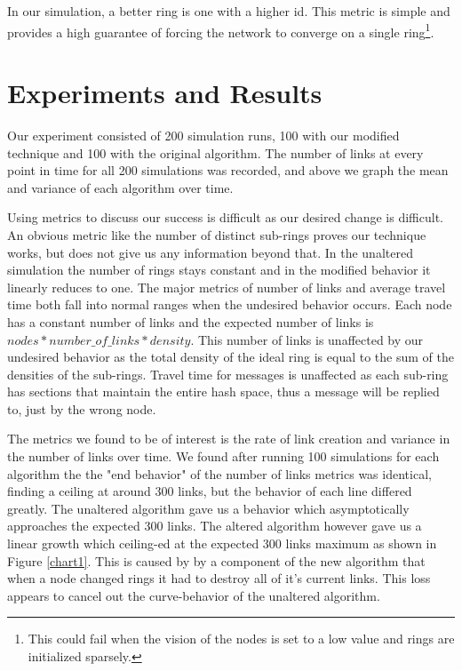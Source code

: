 \documentclass[12pt]{ieeetran} %
\begin{document}
In our simulation, a better ring is one with a higher id.   This metric is simple and  provides a high guarantee of forcing the network to converge on a single ring\footnote{This could fail when the vision of the nodes is set to a low value and rings are initialized sparsely.}.










\section{Experiments and Results}
Our experiment consisted of 200 simulation runs, 100 with our modified technique and 100 with the original algorithm. The number of links at every point in time for all 200 simulations was recorded, and above we graph the mean and variance of each algorithm over time.

Using metrics to discuss our success is difficult as our desired change is difficult. An obvious metric like the number of distinct sub-rings proves our technique works, but does not give us any information beyond that. In the unaltered simulation the number of rings stays constant and in the modified behavior it linearly reduces to one. The major metrics of number of links and average travel time both fall into normal ranges when the undesired behavior occurs. Each node has a constant number of links and the expected number of links is $nodes * number\_of\_links * density$. This number of links is unaffected by our undesired behavior as the total density of the ideal ring is equal to the sum of the densities of the sub-rings. Travel time for messages is unaffected as each sub-ring has sections that maintain the entire hash space, thus a message will be replied to, just by the wrong node.

The metrics we found to be of interest is the rate of link creation and variance in the number of links over time. We found after running 100 simulations for each algorithm the the "end behavior" of the number of links metrics was identical, finding a ceiling at around 300 links, but the behavior of each line differed greatly. The unaltered algorithm gave us a behavior which asymptotically approaches the expected 300 links. The altered algorithm however gave us a linear growth which ceiling-ed at the expected 300 links maximum as shown in Figure \ref{chart1}.  This is caused by by a component of the new algorithm that when a node changed rings it had to destroy all of it's current links. This loss appears to cancel out the curve-behavior of the unaltered algorithm. 
\end{document}
